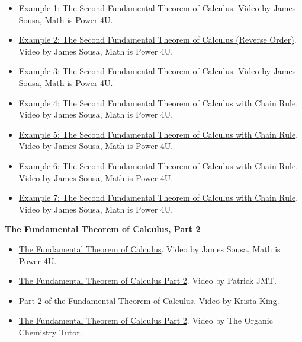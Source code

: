 \begin{itemize}
\item \href{https://youtu.be/YE9jpfxEFYk}{Example 1: The Second Fundamental Theorem of Calculus}.  
Video by James Sousa, Math is Power 4U.

\item \href{https://youtu.be/gJtkTRjqM6I}{Example 2: The Second Fundamental Theorem of Calculus (Reverse Order)}.  
Video by James Sousa, Math is Power 4U.

\item \href{https://youtu.be/X5ke8bUiiQM}{Example 3: The Second Fundamental Theorem of Calculus}.  
Video by James Sousa, Math is Power 4U.

\item \href{https://youtu.be/ep52C-MUzDY}{Example 4: The Second Fundamental Theorem of Calculus with Chain Rule}.  
Video by James Sousa, Math is Power 4U.

\item \href{https://youtu.be/8IrK5JcjMvM}{Example 5: The Second Fundamental Theorem of Calculus with Chain Rule}.  
Video by James Sousa, Math is Power 4U.

\item \href{https://youtu.be/6p5NQwAeZRc}{Example 6: The Second Fundamental Theorem of Calculus with Chain Rule}.  
Video by James Sousa, Math is Power 4U.

\item \href{https://youtu.be/18qhfQ2IeLU}{Example 7: The Second Fundamental Theorem of Calculus with Chain Rule}.  
Video by James Sousa, Math is Power 4U.

\end{itemize}

\medskip

\textbf{The Fundamental Theorem of Calculus, Part 2}

\begin{itemize}

\item \href{https://youtu.be/7AteFyUCyZo}{The Fundamental Theorem of Calculus}.  
Video by James Sousa, Math is Power 4U.

\item \href{https://youtu.be/nHnZVFeQvNQ}{The Fundamental Theorem of Calculus Part 2}.  
Video by Patrick JMT.

\item \href{https://youtu.be/T-J7SkiE39Y}{Part 2 of the Fundamental Theorem of Calculus}.  
Video by Krista King.

\item \href{https://youtu.be/ns8N1UuXl4w}{The Fundamental Theorem of Calculus Part 2}.  
Video by The Organic Chemistry Tutor.

\end{itemize}


